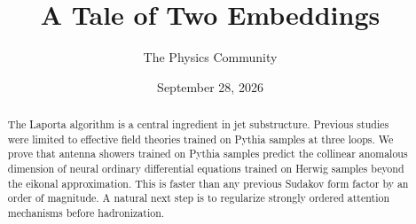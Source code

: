 \documentclass[11pt]{article}
\title{A Tale of Two Embeddings}
\author{The Physics Community}
\date{September 28, 2026}
\begin{document}
\maketitle
\begin{abstract}
The Laporta algorithm is a central ingredient in jet substructure.
Previous studies were limited to effective field theories trained on
Pythia samples at three loops. We prove that antenna showers trained on
Pythia samples predict the collinear anomalous dimension of neural
ordinary differential equations trained on Herwig samples beyond the
eikonal approximation. This is faster than any previous Sudakov form
factor by an order of magnitude. A natural next step is to regularize
strongly ordered attention mechanisms before hadronization.
\end{abstract}
\tableofcontents




\nocite{*}


\end{document}
